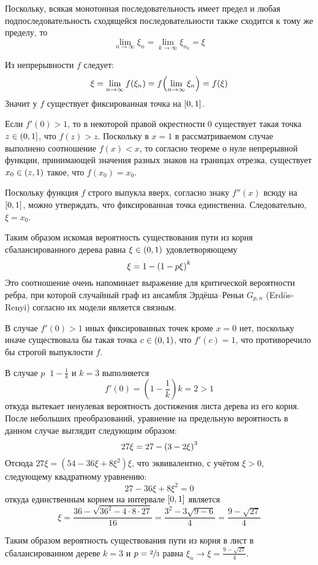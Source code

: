 \documentclass[a4paper]{article}
\let\originalleft\left
\let\originalright\right
\renewcommand{\left}{\mathopen{}\mathclose\bgroup\originalleft}
\renewcommand{\right}{\aftergroup\egroup\originalright}
\newcommand{\clo}[1]{{\left [ #1 \right ]}}
\newcommand{\ploc}[1]{{\left ( #1 \right ]}}
\newcommand{\brac}[1]{{\left ( #1 \right )}}
\newcommand{\defn}{{\mathop{\overset{\Delta}{=}}\nolimits}}
\newcommand{\eng}[1]{\foreignlanguage{english}{#1}}
\begin{document}
Поскольку, всякая монотонная последовательность имеет предел и любая
подпоследовательность сходящейся последовательности также сходится к тому же
пределу, то
\[\lim_{n\to \infty} \xi_n = \lim_{k\to \infty} \xi_{n_k} = \xi \]

Из непрерывности $f$ следует:
\[\xi = \lim_{n\to \infty} f(\xi_n) = f\brac{\lim_{n \to\infty}\xi_n} = f(\xi)\]
Значит у $f$ существует фиксированная точка на $\clo{0,1}$.

Если $f'(0)>1$, то в некоторой правой окрестности $0$ существует такая точка
$z\in\ploc{0,1}$, что $f(z)>z$.
Поскольку в $x=1$ в рассматриваемом случае выполнено соотношение $f(x)<x$, то
согласно теореме о нуле непрерывной функции, принимающей значения разных
знаков на границах отрезка, существует $x_0\in \brac{z,1}$ такое,
что $f(x_0) = x_0$.

Поскольку функция $f$ строго выпукла вверх, согласно знаку $f''(x)$ всюду на
$\clo{0,1}$, можно утверждать, что фиксированная точка единственна.
Следовательно, $\xi=x_0$.

Таким образом искомая вероятность существования пути из корня
сбалансированного дерева равна $\xi\in \brac{0,1}$ удовлетворяющему
\[\xi = 1 - \brac{1 - p \xi }^k\]
Это соотношение очень напоминает выражение для критической вероятности ребра,
при которой случайный граф из ансамбля Эрдёша–Реньи $G_{p,n}$
(\eng{Erd\"os-Renyi}) согласно их модели является связным.

В случае $f'(0)>1$ иных фиксированных точек кроме $x=0$ нет, поскольку иначе
существовала бы такая точка $c\in \brac{0,1}$, что $f'(c)=1$, что
противоречило бы строгой выпуклости $f$.

В случае $p\defn 1-\frac{1}{k}$ и $k=3$ выполняется
\[f'(0) = (1-\frac{1}{k}) k = 2 > 1 \]
откуда вытекает ненулевая вероятность достижения листа дерева из его корня.
После небольших преобразований, уравнение на предельную вероятность в данном
случае выглядит следующим образом:
\[27 \xi = 27 - \brac{ 3 - 2 \xi }^3\]
Отсюда $27 \xi = ( 54 - 36 \xi + 8 \xi^2 )\xi$, что эквивалентно, с учётом
$\xi>0$, следующему квадратному уравнению:
\[27 - 36 \xi + 8 \xi^2 = 0\]
откуда единственным корнем на интервале $\clo{0,1}$ является
\[\xi = \frac{36 - \sqrt{ 36^2 - 4 \cdot 8\cdot 27}}{16}
= \frac{3^2 - 3 \sqrt{ 9-6 }}{4} = \frac{9 - \sqrt{ 27 }}{4}\]

Таким образом вероятность существования пути из корня в лист в сбалансированном
дереве $k=3$ и $p=\sfrac{2}{3}$ равна
$\xi_n \to \xi = \frac{9 - \sqrt{ 27 }}{4}$.



\end{document}
